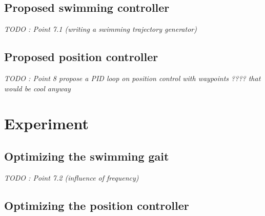 \documentclass[11pt]{article}
\begin{document}
\subsection{Proposed swimming controller}

\textit{TODO : Point 7.1 (writing a swimming trajectory generator)}

\subsection{Proposed position controller}

\textit{TODO : Point 8 propose a PID loop on position control with waypoints ???? that would be cool anyway}

\section{Experiment}

\subsection{Optimizing the swimming gait}

\textit{TODO : Point 7.2 (influence of frequency)}

\subsection{Optimizing the position controller}

\printbibliography %
\end{document}
